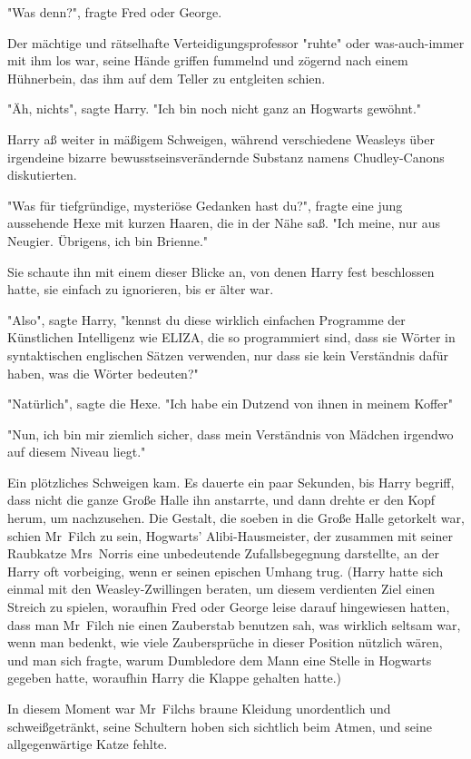 {"Was denn?", fragte Fred oder George.

Der mächtige und rätselhafte Verteidigungsprofessor "ruhte" oder was-auch-immer mit ihm los war, seine Hände griffen fummelnd und zögernd nach einem Hühnerbein, das ihm auf dem Teller zu entgleiten schien.

"Äh, nichts", sagte Harry. "Ich bin noch nicht ganz an Hogwarts gewöhnt."

Harry aß weiter in mäßigem Schweigen, während verschiedene Weasleys über irgendeine bizarre bewusstseinsverändernde Substanz namens Chudley-Canons diskutierten.

"Was für tiefgründige, mysteriöse Gedanken hast du?", fragte eine jung aussehende Hexe mit kurzen Haaren, die in der Nähe saß. "Ich meine, nur aus Neugier. Übrigens, ich bin Brienne."

Sie schaute ihn mit einem dieser Blicke an, von denen Harry fest beschlossen hatte, sie einfach zu ignorieren, bis er älter war.

"Also", sagte Harry, "kennst du diese wirklich einfachen Programme der Künstlichen Intelligenz wie ELIZA, die so programmiert sind, dass sie Wörter in syntaktischen englischen Sätzen verwenden, nur dass sie kein Verständnis dafür haben, was die Wörter bedeuten?"

"Natürlich", sagte die Hexe. "Ich habe ein Dutzend von ihnen in meinem Koffer"

"Nun, ich bin mir ziemlich sicher, dass mein Verständnis von Mädchen irgendwo auf diesem Niveau liegt."

Ein plötzliches Schweigen kam. Es dauerte ein paar Sekunden, bis Harry begriff, dass nicht die ganze Große Halle ihn anstarrte, und dann drehte er den Kopf herum, um nachzusehen. Die Gestalt, die soeben in die Große Halle getorkelt war, schien Mr~Filch zu sein, Hogwarts' Alibi-Hausmeister, der zusammen mit seiner Raubkatze Mrs~Norris eine unbedeutende Zufallsbegegnung darstellte, an der Harry oft vorbeiging, wenn er seinen epischen Umhang trug. (Harry hatte sich einmal mit den Weasley-Zwillingen beraten, um diesem verdienten Ziel einen Streich zu spielen, woraufhin Fred oder George leise darauf hingewiesen hatten, dass man Mr~Filch nie einen Zauberstab benutzen sah, was wirklich seltsam war, wenn man bedenkt, wie viele Zaubersprüche in dieser Position nützlich wären, und man sich fragte, warum Dumbledore dem Mann eine Stelle in Hogwarts gegeben hatte, woraufhin Harry die Klappe gehalten hatte.)

In diesem Moment war Mr~Filchs braune Kleidung unordentlich und schweißgetränkt, seine Schultern hoben sich sichtlich beim Atmen, und seine allgegenwärtige Katze fehlte.

}
